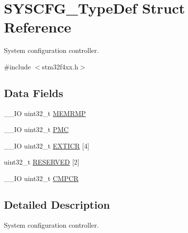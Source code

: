 \hypertarget{struct_s_y_s_c_f_g___type_def}{\section{S\-Y\-S\-C\-F\-G\-\_\-\-Type\-Def Struct Reference}
\label{struct_s_y_s_c_f_g___type_def}
}


System configuration controller.  




{\ttfamily \#include $<$stm32f4xx.\-h$>$}

\subsection*{Data Fields}
\begin{DoxyCompactItemize}
\item 
\-\_\-\-\_\-\-I\-O uint32\-\_\-t \hyperlink{struct_s_y_s_c_f_g___type_def_ab36c409d0a009e3ce5a89ac55d3ff194}{M\-E\-M\-R\-M\-P}
\item 
\-\_\-\-\_\-\-I\-O uint32\-\_\-t \hyperlink{struct_s_y_s_c_f_g___type_def_a2130abf1fefb63ce4c4b138fd8c9822a}{P\-M\-C}
\item 
\-\_\-\-\_\-\-I\-O uint32\-\_\-t \hyperlink{struct_s_y_s_c_f_g___type_def_a52f7bf8003ba69d66a4e86dea6eeab65}{E\-X\-T\-I\-C\-R} \mbox{[}4\mbox{]}
\item 
uint32\-\_\-t \hyperlink{struct_s_y_s_c_f_g___type_def_afaf27b66c1edc60064db3fa6e693fb59}{R\-E\-S\-E\-R\-V\-E\-D} \mbox{[}2\mbox{]}
\item 
\-\_\-\-\_\-\-I\-O uint32\-\_\-t \hyperlink{struct_s_y_s_c_f_g___type_def_a08ddbac546fa9928256654d31255c8c3}{C\-M\-P\-C\-R}
\end{DoxyCompactItemize}


\subsection{Detailed Description}
System configuration controller. 


